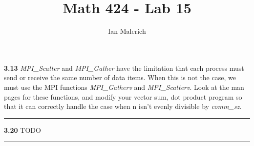 \documentclass[12pt]{jhwhw}
\author{Ian Malerich}
\title{Math 424 - Lab 15}
\begin{document}
\raggedright


\textbf{3.13}
	\textit{MPI_Scatter} and \textit{MPI_Gather} have the limitation that each process must send
	or receive the same number of data items. When this is not the case, we must use
	the MPI functions \textit{MPI_Gatherv} and \textit{MPI_Scatterv}. Look at the man pages
	for these functions, and modify your vector sum, dot product program so
	that it can correctly handle the case when n isn't evenly divisible by \textit{comm_sz}.
\textcolor[RGB]{240,240,240}{\rule{\textwidth}{0.5pt}}\bigbreak

	\begin{addmargin}[1em]{}
	\end{addmargin}

\textbf{3.20}
	TODO
\textcolor[RGB]{240,240,240}{\rule{\textwidth}{0.5pt}}\bigbreak

	\begin{addmargin}[1em]{}
	\end{addmargin}
\end{document}
